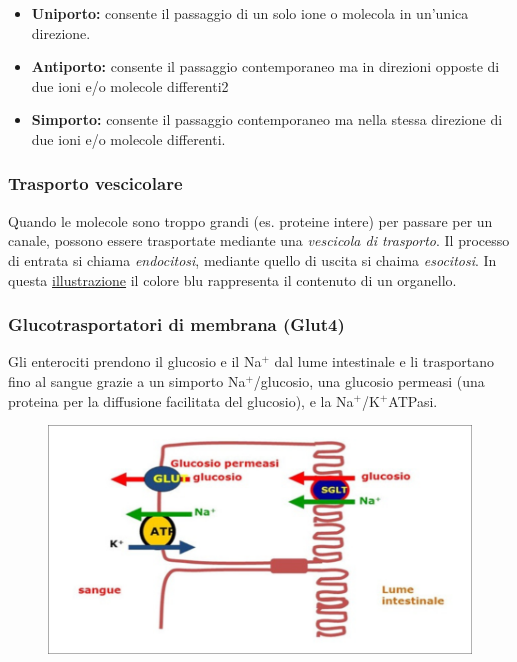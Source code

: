 \documentclass[a4paper]{article}
\begin{document}

\begin{itemize}
    \item \textbf{Uniporto:} consente il passaggio di un solo ione o molecola in un'unica direzione.
    \item \textbf{Antiporto:} consente il passaggio contemporaneo ma in direzioni opposte di due ioni e/o molecole differenti2
    \item \textbf{Simporto:} consente il passaggio contemporaneo ma nella stessa direzione di due ioni e/o molecole differenti.
\end{itemize}

\subsubsection{Trasporto vescicolare}

Quando le molecole sono troppo grandi (es. proteine intere) per passare per un canale, possono essere trasportate 
mediante una \textit{vescicola di trasporto}. Il processo di entrata si chiama \textit{endocitosi},
mediante quello di uscita si chaima \textit{esocitosi}. 
In questa \href{https://youtu.be/uYpNUw7vPO4}{illustrazione} il colore blu rappresenta il contenuto di un organello.

\pagebreak

\subsubsection{Glucotrasportatori di membrana (Glut4)}

Gli enterociti prendono il glucosio e il Na\({}^+\) dal lume intestinale
e li trasportano fino al sangue grazie a un simporto Na\({}^+\)/glucosio, una glucosio permeasi
(una proteina per la diffusione facilitata del glucosio), e la Na\({}^+\)/K\({}^+\)ATPasi. 


\begin{figure}[h]
    \centering
    \includegraphics[width=\textwidth]{./glut4.png}
\end{figure}
\end{document}
